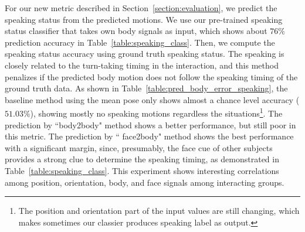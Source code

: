 For our new metric described in Section~\ref{section:evaluation}, we predict the speaking status from the predicted motions. We use our pre-trained speaking status classifier that takes own body signals as input, which shows about $76\%$ prediction accuracy in Table~\ref{table:speaking_class}. Then, we compute the speaking status accuracy using ground truth speaking status. The speaking is closely related to the turn-taking timing in the interaction, and this method penalizes if the predicted body motion does not follow the speaking timing of the ground truth data. As shown in Table~\ref{table:pred_body_error_speaking}, the baseline method using the mean pose only shows almost a chance level accuracy ($51.03\%$), showing mostly no speaking motions regardless the situations\footnote{The position and orientation part of the input values are still changing, which makes sometimes our classier produces speaking label as output.}. The prediction by ``body2body" method shows a better performance, but still poor in this metric. The prediction by `` face2body" method shows the best performance with a significant margin, since, presumably, the face cue of other subjects provides a strong clue to determine the speaking timing, as demonstrated in Table~\ref{table:speaking_class}. This experiment shows interesting correlations among position, orientation, body, and face signals among interacting groups. %

